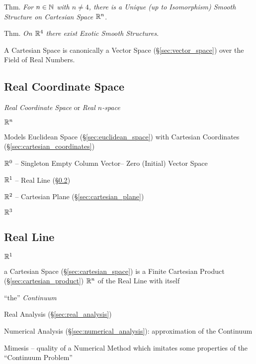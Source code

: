 Thm. \emph{For $n \in \mathbb{N}$ with $n \neq 4$, there is a Unique (up to
  Isomorphism) Smooth Structure on Cartesian Space $\mathbb{R}^n$}.

Thm. \emph{On $\mathbb{R}^4$ there exist Exotic Smooth Structures}.

A Cartesian Space is canonically a Vector Space (\S\ref{sec:vector_space}) over
the Field of Real Numbers.



\subsection{Real Coordinate Space}\label{sec:real_coordinate_space}

\emph{Real Coordinate Space} or \emph{Real $n$-space}

$\mathbb{R}^n$

Models Euclidean Space (\S\ref{sec:euclidean_space}) with Cartesian
Coordinates (\S\ref{sec:cartesian_coordinates})

$\mathbb{R}^0$ -- Singleton Empty Column Vector-- Zero (Initial) Vector
Space

$\mathbb{R}^1$ -- Real Line (\S\ref{sec:real_line})

$\mathbb{R}^2$ -- Cartesian Plane (\S\ref{sec:cartesian_plane})

$\mathbb{R}^3$



\subsection{Real Line}\label{sec:real_line}

$\mathbb{R}^1$

a Cartesian Space (\S\ref{sec:cartesian_space}) is a Finite Cartesian Product
(\S\ref{sec:cartesian_product}) $\mathbb{R}^n$ of the Real Line with itself

``the'' \emph{Continuum}

\fist Real Analysis (\S\ref{sec:real_analysis})

\fist Numerical Analysis (\S\ref{sec:numerical_analysis}): approximation of the
Continuum

Mimesis -- quality of a Numerical Method which imitates some properties of the
``Continuum Problem''

